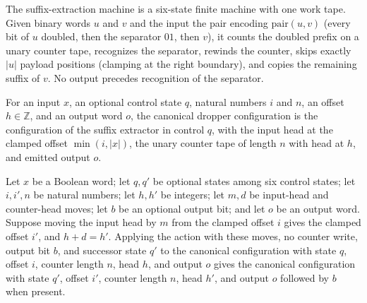 \begin{definition}
\label{Complexity.satDropTM}
\leanok
{}
The suffix-extraction machine is a six-state finite machine with one work tape.
Given binary words $u$ and $v$ and the input
the pair encoding $\mathrm{pair}(u,v)$ (every bit of $u$ doubled, then the separator $01$, then $v$), it counts the doubled prefix on a unary counter tape,
recognizes the separator, rewinds the counter, skips exactly $|u|$ payload
positions (clamping at the right boundary), and copies the remaining suffix of
$v$. No output precedes recognition of the separator.
\end{definition}

\begin{definition}
\label{Complexity.satDropCfg}
\leanok
{}
For an input $x$, an optional control state $q$, natural numbers $i$ and $n$, an
offset $h \in \mathbb{Z}$, and an output word $o$, the canonical dropper
configuration is the configuration of the suffix extractor in control $q$, with the
input head at the clamped offset $\min(i, |x|)$, the unary counter tape of length
$n$ with head at $h$, and emitted output $o$.
\end{definition}

\begin{lemma}
\label{Complexity.satDrop_move}
\leanok
{}
Let $x$ be a Boolean word; let $q,q'$ be optional states among six control states; let
$i,i',n$ be natural numbers; let $h,h'$ be integers; let $m,d$ be input-head and
counter-head moves; let $b$ be an optional output bit; and let $o$ be an output word.
Suppose moving the input head by $m$ from the clamped offset $i$ gives the clamped
offset $i'$, and $h+d=h'$. Applying the action with these moves, no counter write,
output bit $b$, and successor state $q'$ to the canonical configuration with state $q$,
offset $i$, counter length $n$, head $h$, and output $o$ gives the canonical
configuration with state $q'$, offset $i'$, counter length $n$, head $h'$, and output
$o$ followed by $b$ when present.
\end{lemma}

